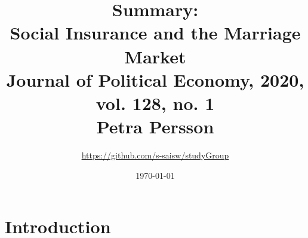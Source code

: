\documentclass[a4paper, 12pt]{article}
\begin{document}
\pagestyle{fancy}
\setlength{\parindent}{5ex}
\setlength{\columnseprule}{0.5pt}

\title{Summary:
\\Social Insurance and the Marriage Market \\
\large Journal of Political Economy, 2020, vol. 128, no. 1 \\
\large Petra Persson
}
\author{\url{https://github.com/s-saisw/studyGroup}}
\date{\today}
\maketitle

\lhead{}

\section{Introduction}
\end{document}
